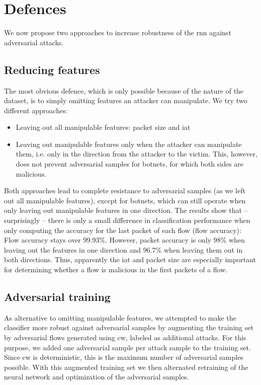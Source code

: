 \documentclass[conference]{IEEEtran}
\begin{document}
\section{Defences}
We now propose two approaches to increase robustness of the \gls{rnn} against adversarial attacks.
\subsection{Reducing features}
The most obvious defence, which is only possible because of the nature of the dataset, is to simply omitting features an attacker can manipulate. We try two different approaches:
\begin{itemize}[topsep=0pt,wide,labelwidth=!,labelindent=0pt]
\item Leaving out all manipulable features: packet size and \gls{iat}
\item Leaving out manipulable features only when the attacker can manipulate them, i.e. only in the direction from the attacker to the victim. This, however, does not prevent adversarial samples for botnets, for which both sides are malicious.
\end{itemize}

Both approaches lead to complete resistance to adversarial samples (as we left out all manipulable features), except for botnets, which can still operate when only leaving out manipulable features in one direction. The results show that -- surprisingly -- there is only a small difference in classification performance when only computing the accuracy for the last packet of each flow (flow accuracy): Flow accuracy stays over 99.93\%. However, packet accuracy is only 98\% when leaving out the features in one direction and 96.7\% when leaving them out in both directions. Thus, apparently the \gls{iat} and packet size are especially important for determining whether a flow is malicious in the first packets of a flow.

\subsection{Adversarial training}
As alternative to omitting manipulable features, we attempted to make the classifier more robust against adversarial samples by augmenting the training set by adversarial flows generated using  \gls{cw}, labeled as additional attacks.
For this purpose, we added one adversarial sample per attack sample to the training set. Since \gls{cw} is deterministic, this is the maximum number of adversarial samples possible. With this augmented training set we then alternated retraining of the neural network and optimization of the adversarial samples. %
\end{document}
